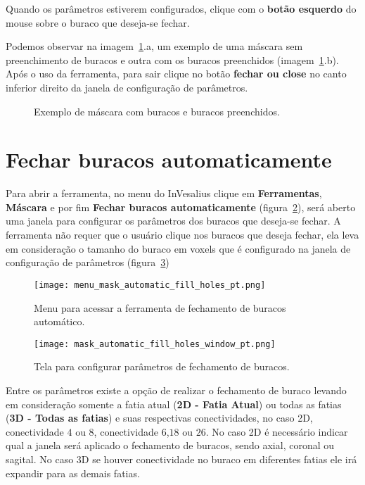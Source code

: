 Quando os parâmetros estiverem configurados, clique com o \textbf{botão esquerdo} do mouse sobre o buraco que deseja-se fechar.

Podemos observar na imagem~\ref{fig:mask_fill_hole}.a, um exemplo de uma máscara sem preenchimento de buracos e outra com os buracos preenchidos (imagem~\ref{fig:mask_fill_hole}.b). Após o uso da ferramenta, para sair clique no botão \textbf{fechar ou close} no canto inferior direito da janela de configuração de parâmetros.

\begin{figure}[!htb]
  \centering
    \qquad
  \hfill
  \caption{Exemplo de máscara com buracos e buracos preenchidos.}
  \label{fig:mask_fill_hole}
\end{figure}


\section{Fechar buracos automaticamente}

Para abrir a ferramenta, no menu do InVesalius clique em \textbf{Ferramentas}, \textbf{Máscara} e por fim \textbf{Fechar buracos automaticamente} (figura~\ref{fig:menu_mask_automatic_fill_holes}), será aberto uma janela para configurar os parâmetros dos buracos que deseja-se fechar. A ferramenta não requer que o usuário clique nos buracos que deseja fechar, ela leva em consideração o tamanho do buraco em voxels que é configurado na janela de configuração de parâmetros (figura~\ref{fig:mask_automatic_fill_holes_window})

\begin{figure}[!htb]
\centering
\texttt{[image: menu\_mask\_automatic\_fill\_holes\_pt.png]}
\caption{Menu para acessar a ferramenta de fechamento de buracos automático.}
\label{fig:menu_mask_automatic_fill_holes}
\end{figure}

\begin{figure}[!htb]
\centering
\texttt{[image: mask\_automatic\_fill\_holes\_window\_pt.png]}
\caption{Tela para configurar parâmetros de fechamento de buracos.}
\label{fig:mask_automatic_fill_holes_window}
\end{figure}

Entre os parâmetros existe a opção de realizar o fechamento de buraco levando em consideração somente a fatia atual (\textbf{2D - Fatia Atual}) ou todas as fatias (\textbf{3D - Todas as fatias}) e suas respectivas conectividades, no caso 2D, conectividade $4$ ou $8$, conectividade $6$,$18$ ou $26$. No caso 2D é necessário indicar qual a janela será aplicado o fechamento de buracos, sendo axial, coronal ou sagital. No caso 3D se houver conectividade no buraco em diferentes fatias ele irá expandir para as demais fatias. 

